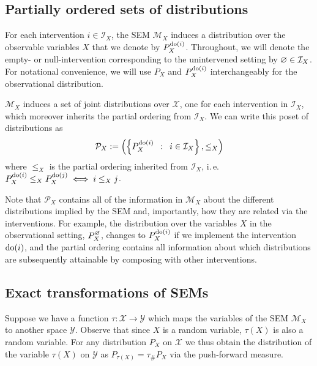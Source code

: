 \subsection{Partially ordered sets of distributions}

For each intervention $i \in \mathcal{I}_X$, the SEM $\mathcal{M}_X$ induces a distribution over the observable variables $X$ that we denote by $P_X^{\operatorname{do}(i)}$.
Throughout, we will denote the empty- or null-intervention corresponding to the unintervened setting by $\varnothing\in \mathcal{I}_X$.
For notational convenience, we will use $P_X$ and $P_X^{\operatorname{do}(i)}$ interchangeably for the observational distribution.

$\mathcal{M}_X$ induces a set of joint distributions over $\mathcal{X}$, one for each intervention in $\mathcal{I}_X$, which moreover inherits the partial ordering from $\mathcal{I}_X$. 
We can write this poset of distributions as
\[\mathcal{P}_X := \left( \left\{ P_X^{\operatorname{do}(i)} \enspace : \enspace i \in \mathcal{I}_X \right\}, \leq_X \right) \]
where $\leq_X$ is the partial ordering inherited from $\mathcal{I}_X$, i.\,e.\ ${P_X^{\operatorname{do}(i)} \leq_X P_X^{\operatorname{do}(j)} \iff i \leq_X j}$.%

Note that $\mathcal{P}_X$ contains all of the information in $\mathcal{M}_X$ about the different distributions implied by the SEM and, importantly, how they are related via the interventions.
For example, the distribution over the variables $X$ in the observational setting, $P_X^\varnothing$, changes to $P_X^{\operatorname{do}(i)}$ if we implement the intervention ${\operatorname{do}(i)}$, and the partial ordering contains all information about which distributions are subsequently attainable by composing with other interventions.


\subsection{Exact transformations of SEMs}

Suppose we have a function ${\tau: \mathcal{X} \to \mathcal{Y}}$ which maps the variables of the SEM $\mathcal{M}_X$ to another space $\mathcal{Y}$.
Observe that since $X$ is a random variable, $\tau(X)$ is also a random variable.
For any distribution $P_X$ on $\mathcal{X}$ we thus obtain the distribution of the variable $\tau(X)$ on $\mathcal{Y}$ as $P_{\tau(X)} = \tau_{\#}P_X$ via the push-forward measure. 

